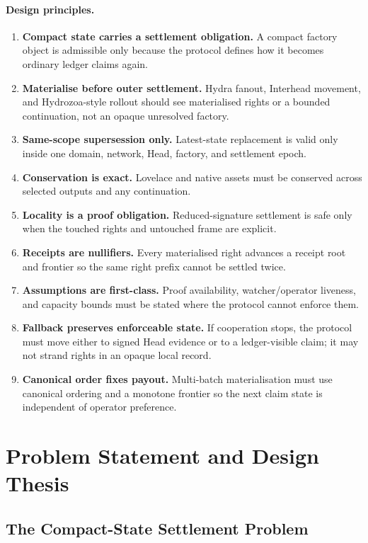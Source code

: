 \documentclass[a4paper,11pt]{article}
\theoremstyle{definition}
\theoremstyle{plain}
\theoremstyle{remark}
\begin{document}
\paragraph{Design principles.}
\begin{enumerate}[label=P\arabic*.,leftmargin=1.2cm]
\item \textbf{Compact state carries a settlement obligation.} A compact factory
object is admissible only because the protocol defines how it becomes ordinary
ledger claims again.
\item \textbf{Materialise before outer settlement.} Hydra fanout,
Interhead movement, and Hydrozoa-style rollout should see materialised rights or
a bounded continuation, not an opaque unresolved factory.
\item \textbf{Same-scope supersession only.} Latest-state replacement is valid
only inside one domain, network, Head, factory, and settlement epoch.
\item \textbf{Conservation is exact.} Lovelace and native assets must be
conserved across selected outputs and any continuation.
\item \textbf{Locality is a proof obligation.} Reduced-signature settlement is
safe only when the touched rights and untouched frame are explicit.
\item \textbf{Receipts are nullifiers.} Every materialised right advances a
receipt root and frontier so the same right prefix cannot be settled twice.
\item \textbf{Assumptions are first-class.} Proof availability, watcher/operator
liveness, and capacity bounds must be stated where the protocol cannot enforce
them.
\item \textbf{Fallback preserves enforceable state.} If cooperation stops, the
protocol must move either to signed Head evidence or to a ledger-visible claim;
it may not strand rights in an opaque local record.
\item \textbf{Canonical order fixes payout.} Multi-batch materialisation must
use canonical ordering and a monotone frontier so the next claim state is
independent of operator preference.
\end{enumerate}

\section{Problem Statement and Design Thesis}
\label{sec:problem}

\subsection{The Compact-State Settlement Problem}
\label{sec:compactness-debt}
\end{document}
